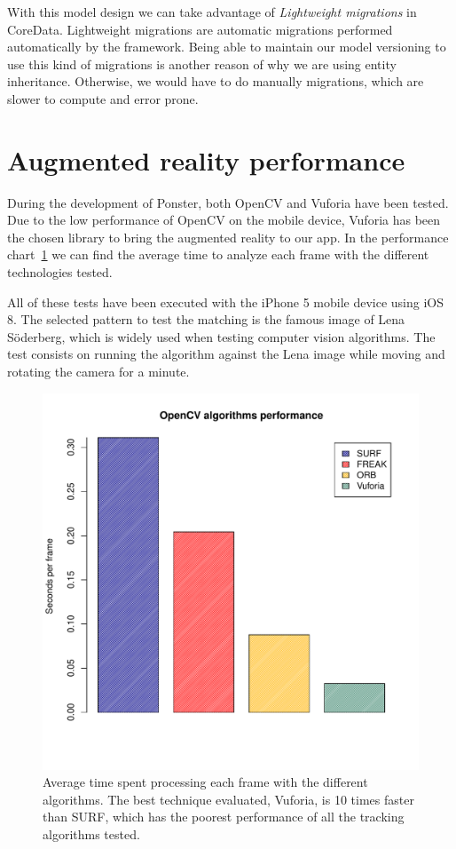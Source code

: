 With this model design we can take advantage of \emph{Lightweight migrations}
in CoreData. Lightweight migrations are automatic migrations performed
automatically by the framework. Being able to maintain our model versioning to
use this kind of migrations is another reason of why we are using entity
inheritance. Otherwise, we would have to do manually migrations, which are
slower to compute and error prone.

\section{Augmented reality performance}
\label{sec:arperf}
During the development of Ponster, both OpenCV and Vuforia have been tested. Due to
the low performance of OpenCV on the mobile device, Vuforia has been the chosen library
to bring the augmented reality to our app. In the performance
chart~\ref{fig:performance} we can find the average time to analyze each frame with
the different technologies tested. 

All of these tests have been executed with the iPhone 5 mobile device using iOS
8. The selected pattern to test the matching is the famous image of Lena Söderberg,
which is widely used when testing computer vision algorithms. The test consists on
running the algorithm against the Lena image while moving and rotating the camera
for a minute.

\begin{figure}
\centering
\includegraphics[scale=0.75]{performance/plot.pdf}
\caption{\label{fig:performance} Average time spent processing each frame with the
  different algorithms. The best technique evaluated, Vuforia, is 10 times faster
  than SURF, which has the poorest performance of all the tracking algorithms
  tested.} 
\end{figure} 

